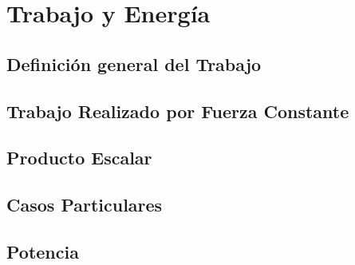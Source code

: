 \chapter{Trabajo y Energía}

\section{Definición general del Trabajo}

\newpage
\section{Trabajo Realizado por Fuerza Constante}

\newpage
\section{Producto Escalar}

\newpage
\section{Casos Particulares}

\newpage
\section{Potencia}
